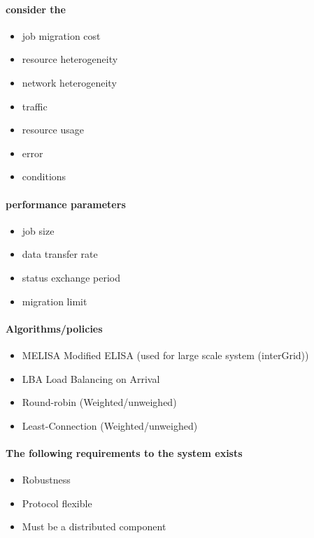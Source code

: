  
\paragraph{consider the} 
\begin{itemize}
\item job migration cost
\item resource heterogeneity
\item network heterogeneity

\item traffic
\item resource usage
\item error
\item conditions
\end{itemize}

\paragraph{performance parameters}
\begin{itemize}
\item job size
\item data transfer rate
\item status exchange period
\item migration limit
\end{itemize}

\paragraph{Algorithms/policies}
\begin{itemize}
	\item MELISA Modified ELISA (used for large scale system (interGrid))
	\item LBA Load Balancing on Arrival
	
	\item Round-robin (Weighted/unweighed)
	\item Least-Connection (Weighted/unweighed)
\end{itemize}

\paragraph{The following requirements to the system exists}
\begin{itemize}
	\item Robustness
	\item Protocol flexible
	\item Must be a distributed component
\end{itemize}

